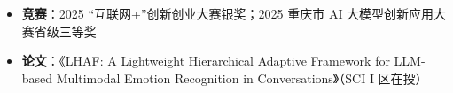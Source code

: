 \documentclass[10pt]{article}
\begin{document}


    


    \section[在校成果]{}
    \begin{itemize}
        \item \textbf{竞赛}：2025 “互联网+”创新创业大赛银奖；2025 重庆市 AI 大模型创新应用大赛省级三等奖
        \item \textbf{论文}：《LHAF: A Lightweight Hierarchical Adaptive Framework for LLM-based Multimodal Emotion Recognition in Conversations》（SCI I 区在投）
    \end{itemize}
\end{document}

